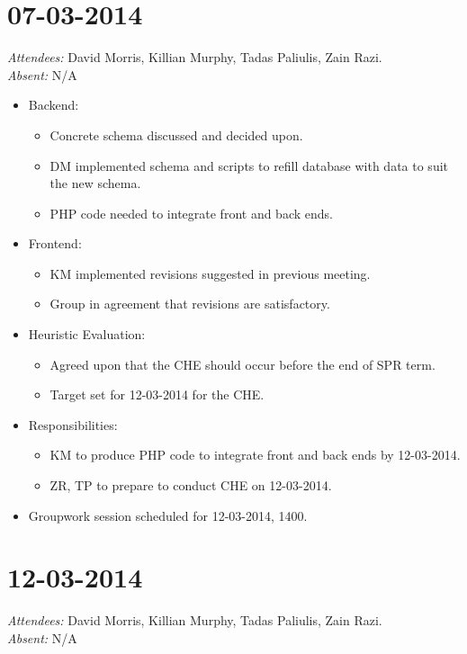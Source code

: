 \documentclass{article}
\begin{document}
\clearpage

\section*{07-03-2014}
\vspace{0.5cm}
\emph{Attendees: }David Morris, Killian Murphy, Tadas Paliulis, Zain Razi.
\\
\emph{Absent: }N/A

\begin{itemize}
\item Backend:
  \begin{itemize}
  \item Concrete schema discussed and decided upon. 
  \item DM implemented schema and scripts to refill database with data to suit the new schema.
  \item PHP code needed to integrate front and back ends.
  \end{itemize}
\item Frontend: 
  \begin{itemize}
  \item KM implemented revisions suggested in previous meeting.
  \item Group in agreement that revisions are satisfactory.
  \end{itemize}
\item Heuristic Evaluation:
  \begin{itemize}
  \item Agreed upon that the CHE should occur before the end of SPR term.
  \item Target set for 12-03-2014 for the CHE.
  \end{itemize}
\item Responsibilities:
  \begin{itemize}
  \item KM to produce PHP code to integrate front and back ends by 12-03-2014.
  \item ZR, TP to prepare to conduct CHE on 12-03-2014.
  \end{itemize}
\item Groupwork session scheduled for 12-03-2014, 1400.
\end{itemize}

\clearpage

\section*{12-03-2014}
\vspace{0.5cm}
\emph{Attendees: }David Morris, Killian Murphy, Tadas Paliulis, Zain Razi.
\\
\emph{Absent: }N/A
\end{document}
